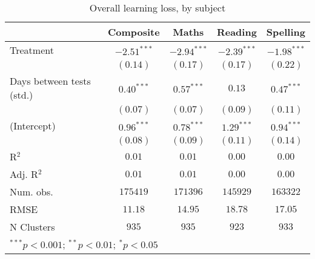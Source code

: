 
\begin{table}
\begin{center}
\begin{tabular}{l c c c c}
\hline
 & Composite & Maths & Reading & Spelling \\
\hline
Treatment                 & $-2.51^{***}$ & $-2.94^{***}$ & $-2.39^{***}$ & $-1.98^{***}$ \\
                          & $(0.14)$      & $(0.17)$      & $(0.17)$      & $(0.22)$      \\
Days between tests (std.) & $0.40^{***}$  & $0.57^{***}$  & $0.13$        & $0.47^{***}$  \\
                          & $(0.07)$      & $(0.07)$      & $(0.09)$      & $(0.11)$      \\
(Intercept)               & $0.96^{***}$  & $0.78^{***}$  & $1.29^{***}$  & $0.94^{***}$  \\
                          & $(0.08)$      & $(0.09)$      & $(0.11)$      & $(0.14)$      \\
\hline
R$^2$                     & $0.01$        & $0.01$        & $0.00$        & $0.00$        \\
Adj. R$^2$                & $0.01$        & $0.01$        & $0.00$        & $0.00$        \\
Num. obs.                 & $175419$      & $171396$      & $145929$      & $163322$      \\
RMSE                      & $11.18$       & $14.95$       & $18.78$       & $17.05$       \\
N Clusters                & $935$         & $935$         & $923$         & $933$         \\
\hline
\multicolumn{5}{l}{\scriptsize{$^{***}p<0.001$; $^{**}p<0.01$; $^{*}p<0.05$}}
\end{tabular}
\caption{Overall learning loss, by subject}
\label{table:overall}
\end{center}
\end{table}
